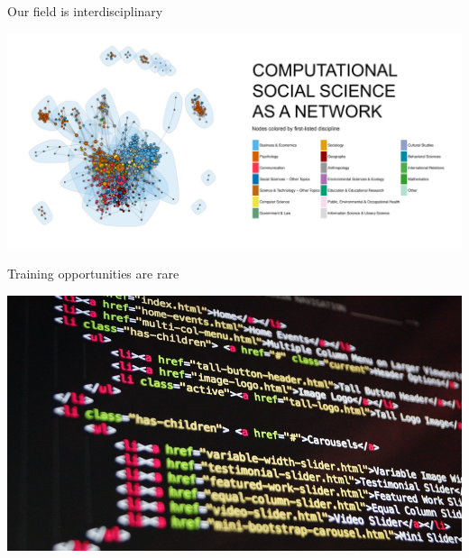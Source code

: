 \documentclass{beamer}
\begin{document}
\begin{frame}{Our field is interdisciplinary}

\begin{center}
\includegraphics[width=1.0\textwidth]{figures/colore_by_nodes_arial.png}
\end{center}

\end{frame}

\begin{frame}{Training opportunities are rare}

\begin{center}
\includegraphics[width=1.0\textwidth]{figures/code.jpg}
\end{center}

\end{frame}
\end{document}
